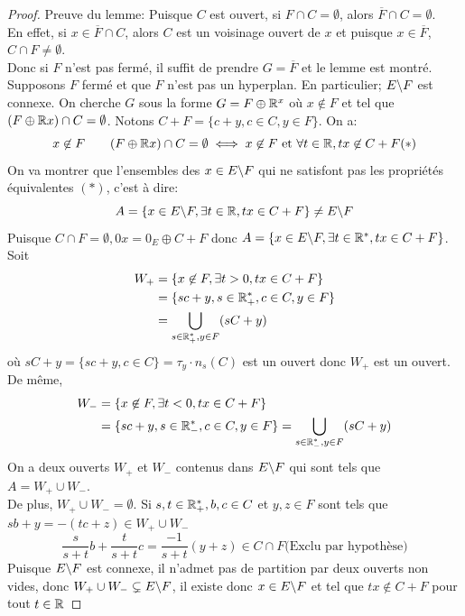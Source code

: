\documentclass[]{report}
\begin{document}
    \begin{proof}
        Preuve du lemme: Puisque $C$ est ouvert, si $F\cap C=\emptyset$, alors $\overline{F}\cap C=\emptyset$.\\
        En effet, si $x\in \overline{F}\cap C$, alors $C$ est un voisinage ouvert de $x$ et puisque $x\in \overline{F}$, $C\cap F\neq \emptyset$.\\
        Donc si $F$ n'est pas fermé, il suffit de prendre $G=\overline{F}$ et le lemme est montré. Supposons $F$ fermé et que $F$ n'est pas un hyperplan. En particulier; $E\backslash F$ est connexe. On cherche $G$ sous la forme $G=F\oplus \mathbb{R}^x$ où $x\not\in F$ et tel que $(F\oplus \mathbb{R} x)\cap C=\emptyset$. Notons $C+F=\{c+y,c\in C,y\in F\}$. On a:
        \[x\not\in F\qquad (F\oplus \mathbb{R} x)\cap C=\emptyset\iff x\not\in F\text{ et }\forall t\in \mathbb{R}, tx\not \in C+F(*)\]
        On va montrer que l'ensembles des $x\in E\backslash F$ qui ne satisfont pas les propriétés équivalentes $(*)$, c'est à dire:
        \[A=\{x\in E\backslash F,\exists t\in \mathbb{R}, tx\in C+F\}\neq E\backslash F\]
        Puisque $C\cap F=\emptyset, 0 x=0_E\oplus C+F$ donc $A=\{x\in E\backslash F,\exists t\in \mathbb{R}^*, tx\in C+F\}$. Soit
        \begin{align*}
            W_+&=\{x\not \in F, \exists t>0,tx\in C+F\}\\
            &=\{sc+y,s\in \mathbb{R}_+^*,c\in C, y\in F\}\\
            &=\bigcup_{s\in \mathbb{R}_+^*,y\in F} (sC+y)
        \end{align*}
        où $sC+y=\{sc+y,c\in C\}=\tau_y\cdot n_s(C)$ est un ouvert donc $W_+$ est un ouvert. De même,
        \begin{align*}
            W_-&= \{x\not\in F,\exists t<0,tx\in C+F\}\\
            &=\{sc+y,s\in \mathbb{R}_-^*,c\in C,y\in F\}=\bigcup_{s\in \mathbb{R}_-^*,y\in F}(sC+y)
        \end{align*}
        On a deux ouverts $W_+$ et $W_-$ contenus dans $E\backslash F$ qui sont tels que $A=W_+\cup W_-$.\\
        De plus, $W_+\cup W_-=\emptyset$. Si $s,t\in \mathbb{R}_+^*,b,c\in C$ et $y,z\in F$ sont tels que $sb+y=-(tc+z)\in W_+\cup W_-$
        \[\frac{s}{s+t}b+\frac{t}{s+t}c=\frac{-1}{s+t}(y+z)\in C\cap F \text{(Exclu par hypothèse)}\]
        Puisque $E\backslash F$ est connexe, il n'admet pas de partition par deux ouverts non vides, donc $W_+\cup W_-\subsetneq E\backslash F$, il existe donc $x\in E\backslash F$ et tel que $tx\notin C+F$ pour tout $t\in \mathbb{R}$
    \end{proof}
\end{document}
